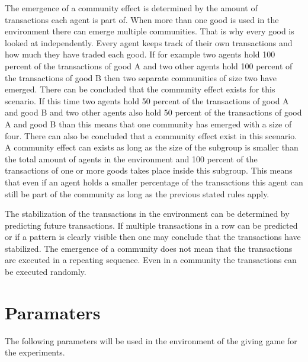 \documentclass[twoside,openright]{uva-bachelor-thesis}
\begin{document}
The emergence of a community effect is determined by the amount of transactions each agent is part of. When more than one good is used in the environment there can emerge multiple communities. That is why every good is looked at independently. Every agent keeps track of their own transactions and how much they have traded each good. If for example two agents hold 100 percent of the transactions of good A and two other agents hold 100 percent of the transactions of good B then two separate communities of size two have emerged. There can be concluded that the community effect exists for this scenario. If this time two agents hold 50 percent of the transactions of good A and good B and two other agents also hold 50 percent of the transactions of good A and good B than this means that one community has emerged with a size of four. There can also be concluded that a community effect exist in this scenario. A community effect can exists as long as the size of the subgroup is smaller than the total amount of agents in the environment and 100 percent of the transactions of one or more goods takes place inside this subgroup. This means that even if an agent holds a smaller percentage of the transactions this agent can still be part of the community as long as the previous stated rules apply.

The stabilization of the transactions in the environment can be determined by predicting future transactions. If multiple transactions in a row can be predicted or if a pattern is clearly visible then one may conclude that the transactions have stabilized. The emergence of a community does not mean that the transactions are executed in a repeating sequence. Even in a community the transactions can be executed randomly.


\section{Paramaters}
The following parameters will be used in the environment of the giving game for the experiments.
\end{document}
